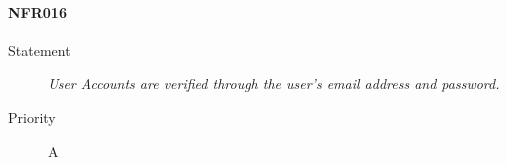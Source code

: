 \paragraph{NFR016}
\begin{description}
  \item [Statement] \textit{User \gls{Account}s are verified through the user's email address and password.}
  \item [Priority] A
\end{description}
